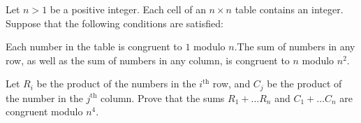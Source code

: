 Let $n>1$ be a positive integer. Each cell of an $n\times n$ table contains an integer. Suppose that the following conditions are satisfied:

Each number in the table is congruent to $1$ modulo $n$.The sum of numbers in any row, as well as the sum of numbers in any column, is congruent to $n$ modulo $n^2$.

Let $R_i$ be the product of the numbers in the $i^{\text{th}}$ row, and $C_j$ be the product of the number in the $j^{\text{th}}$ column. Prove that the sums $R_1+\hdots R_n$ and $C_1+\hdots C_n$ are congruent modulo $n^4$.